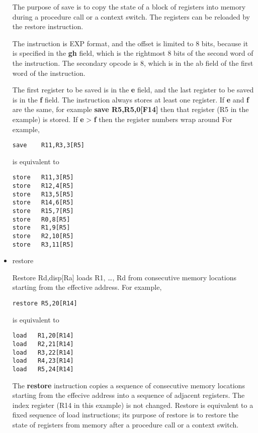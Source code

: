 \documentclass[11pt]{article}
\begin{document}
\begin{itemize}
The purpose of save is to copy the state of a block of
registers into memory during a procedure call or a context switch.
The registers can be reloaded by the restore instruction.



The instruction is EXP format, and the offset is limited to 8 bits,
because it is specified in the \textbf{gh} field, which is the rightmost 8
bits of the second word of the instruction.  The secondary opcode is
8, which is in the ab field of the first word of the instruction.

The first register to be saved is in the \textbf{e} field, and the last
register to be saved is in the \textbf{f} field.  The instruction always
stores at least one register.  If \textbf{e} and \textbf{f} are the same, for
example \textbf{save R5,R5,0[F14]} then that register (R5 in the example) is
stored.  If \textbf{e} > \textbf{f} then the register numbers wrap around  For
example, 

\begin{verbatim}
save    R11,R3,3[R5]
\end{verbatim}

is equivalent to
\begin{verbatim}
store   R11,3[R5]
store   R12,4[R5]
store   R13,5[R5]
store   R14,6[R5]
store   R15,7[R5]
store   R0,8[R5]
store   R1,9[R5]
store   R2,10[R5]
store   R3,11[R5]
\end{verbatim}

\item restore
\label{sec:org472fb2e}

Restore Rd,disp[Ra] loads R1, \ldots{}, Rd from consecutive memory
locations starting from the effective address.
For example,

\begin{verbatim}
restore R5,20[R14]
\end{verbatim}

is equivalent to

\begin{verbatim}
load   R1,20[R14]
load   R2,21[R14]
load   R3,22[R14]
load   R4,23[R14]
load   R5,24[R14]
\end{verbatim}

The \textbf{\textbf{restore}} instruction copies a sequence of consecutive memory
locations starting from the effecive address into a sequence of
adjacent registers.  The index register (R14 in this example) is not
changed.  Restore is equivalent to a fixed sequence of load
instructions; its purpose of restore is to restore the state of
registers from memory after a procedure call or a context switch.


\end{itemize}
\end{document}
